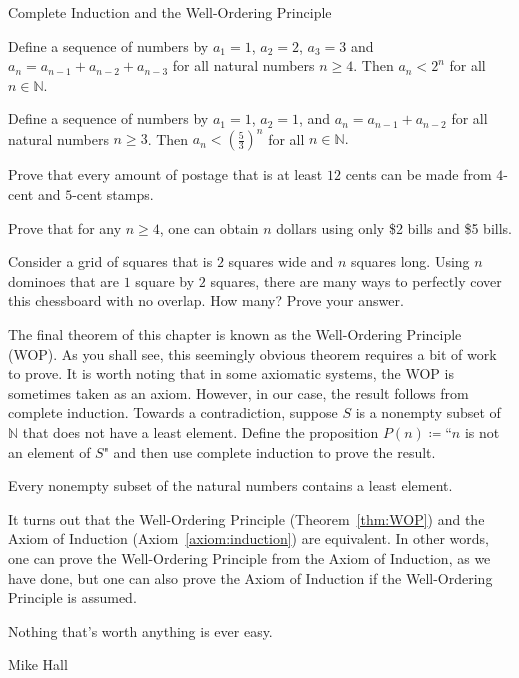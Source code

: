 \begin{section}{Complete Induction and the Well-Ordering Principle}
\begin{theorem}
Define a sequence of numbers by $a_1=1$, $a_2=2$, $a_3=3$ and $a_n=a_{n-1}+a_{n-2}+a_{n-3}$ for all natural numbers $n\geq 4$.  Then $a_n<2^n$ for all $n\in\mathbb N$.
\end{theorem}

\begin{theorem}
Define a sequence of numbers by $a_1=1$, $a_2=1$, and $a_n=a_{n-1}+a_{n-2}$ for all natural numbers $n \geq 3$.  Then $a_n < \left ( \frac{5}{3} \right )^n$ for all $n \in \mathbb{N}.$
\end{theorem}

\begin{problem}
Prove that every amount of postage that is at least $12$ cents can be made from $4$-cent and $5$-cent stamps.
\end{problem}

\begin{problem}
Prove that for any $n \geq 4$, one can obtain $n$ dollars using only \$2 bills and \$5 bills.
\end{problem}

\begin{problem}
Consider a grid of squares that is $2$ squares wide and $n$ squares long.  Using $n$ dominoes that are $1$ square by $2$ squares, there are many ways to perfectly cover this chessboard with no overlap.  How many?  Prove your answer.
\end{problem}

The final theorem of this chapter is known as the Well-Ordering Principle (WOP). As you shall see, this seemingly obvious theorem requires a bit of work to prove. It is worth noting that in some axiomatic systems, the WOP is sometimes taken as an axiom.  However, in our case, the result follows from complete induction. Towards a contradiction, suppose $S$ is a nonempty subset of $\mathbb{N}$ that does not have a least element.  Define the proposition $P(n)\coloneqq $``$n$ is not an element of $S$" and then use complete induction to prove the result.

\begin{theorem}\label{thm:WOP}
Every nonempty subset of the natural numbers contains a least element.
\end{theorem}

It turns out that the Well-Ordering Principle (Theorem~\ref{thm:WOP}) and the Axiom of Induction (Axiom~\ref{axiom:induction}) are equivalent.  In other words, one can prove the Well-Ordering Principle from the Axiom of Induction, as we have done, but one can also prove the Axiom of Induction if the Well-Ordering Principle is assumed.

\epigraph{Nothing that's worth anything is ever easy.}{Mike Hall}

\end{section}